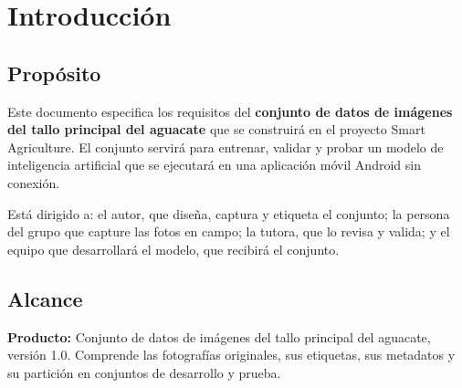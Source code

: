 \documentclass[11pt]{article}
\begin{document}
\tableofcontents
\clearpage
\section{Introducción}
\subsection{Propósito}
Este documento especifica los requisitos del \textbf{conjunto de datos de imágenes del tallo principal del aguacate} que se construirá en el proyecto Smart Agriculture. El conjunto servirá para entrenar, validar y probar un modelo de inteligencia artificial que se ejecutará en una aplicación móvil Android sin conexión.

Está dirigido a: el autor, que diseña, captura y etiqueta el conjunto; la persona del grupo que capture las fotos en campo; la tutora, que lo revisa y valida; y el equipo que desarrollará el modelo, que recibirá el conjunto.

\subsection{Alcance}
\textbf{Producto:} Conjunto de datos de imágenes del tallo principal del aguacate, versión 1.0. Comprende las fotografías originales, sus etiquetas, sus metadatos y su partición en conjuntos de desarrollo y prueba.
\end{document}
